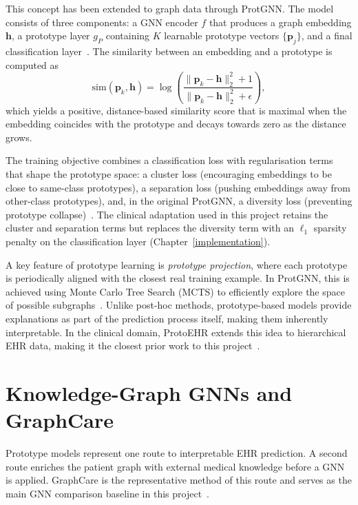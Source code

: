 This concept has been extended to graph data through ProtGNN. The model consists
of three components: a GNN encoder $f$ that produces a graph embedding
$\mathbf{h}$, a prototype layer $g_P$ containing $K$ learnable prototype vectors
$\{\mathbf{p}_j\}$, and a final classification layer~\cite{zhang2022protgnn}.
The similarity between an embedding and a prototype is computed as
%
\begin{equation}
\mathrm{sim}(\mathbf{p}_k, \mathbf{h}) = \log\!\left(
  \frac{\lVert \mathbf{p}_k - \mathbf{h}\rVert_2^2 + 1}
       {\lVert \mathbf{p}_k - \mathbf{h}\rVert_2^2 + \epsilon}
\right),
\end{equation}
%
which yields a positive, distance-based similarity score that is maximal when
the embedding coincides with the prototype and decays towards zero as the
distance grows.

The training objective combines a classification loss with regularisation terms
that shape the prototype space: a cluster loss (encouraging embeddings to be
close to same-class prototypes), a separation loss (pushing embeddings away from
other-class prototypes), and, in the original ProtGNN, a diversity loss
(preventing prototype collapse)~\cite{zhang2022protgnn}. The clinical adaptation
used in this project retains the cluster and separation terms but replaces the
diversity term with an $\ell_1$ sparsity penalty on the classification layer
(Chapter~\ref{implementation}).

A key feature of prototype learning is \emph{prototype projection}, where each
prototype is periodically aligned with the closest real training example. In
ProtGNN, this is achieved using Monte Carlo Tree Search (MCTS) to efficiently
explore the space of possible subgraphs~\cite{zhang2022protgnn}. Unlike post-hoc
methods, prototype-based models provide explanations as part of the prediction
process itself, making them inherently interpretable. In the clinical domain,
ProtoEHR extends this idea to hierarchical EHR data, making it the closest prior
work to this project~\cite{cai2025protoehr}.

\section{Knowledge-Graph GNNs and GraphCare}
\label{sec:graphcare}

Prototype models represent one route to interpretable EHR prediction. A second
route enriches the patient graph with external medical knowledge before a GNN is
applied. GraphCare is the representative method of this route and serves as the
main GNN comparison baseline in this project~\cite{jiang2024graphcare}.

